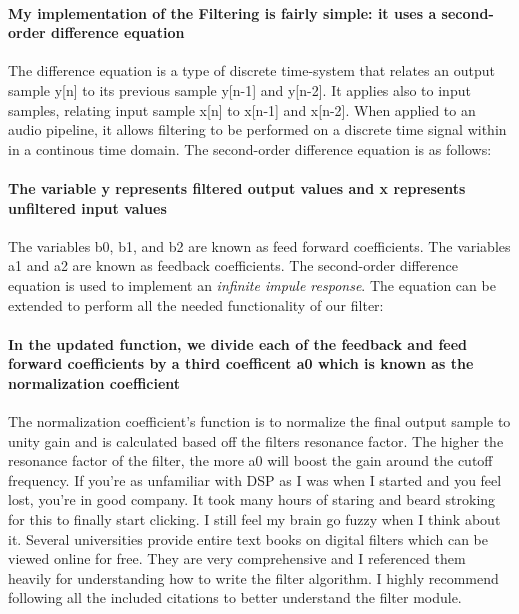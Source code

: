 \documentclass[acmlarge,screen]{acmart}
\begin{document}
	\paragraph{My implementation of the Filtering is fairly simple: it uses a second-order difference equation} The difference equation is a type of discrete time-system that relates an output sample y[n] to its previous sample y[n-1] and y[n-2]. It applies also to input samples, relating input sample x[n] to x[n-1] and x[n-2]. When applied to an audio pipeline, it allows filtering to be performed on a discrete time signal within in a continous time domain.\cite{stanford_2007} The second-order difference equation is as follows: 
	
	
	\paragraph{The variable y represents filtered output values and x represents unfiltered input values} The variables b0, b1, and b2 are known as feed forward coefficients. The variables a1 and a2 are known as feedback coefficients. The second-order difference equation is used to implement an \textit{infinite impule response}. The equation can be extended to perform all the needed functionality of our filter:
	
	
	\paragraph{In the updated function, we divide each of the feedback and feed forward coefficients by a third coefficent a0 which is known as the normalization coefficient} The normalization coefficient's function is to normalize the final output sample to unity gain and is calculated based off the filters resonance factor. The higher the resonance factor of the filter, the more a0 will boost the gain around the cutoff frequency. If you're as unfamiliar with DSP as I was when I started and you feel lost, you're in good company. It took many hours of staring and beard stroking for this to finally start clicking. I still feel my brain go fuzzy when I think about it. Several universities provide entire text books on digital filters which can be viewed online for free. They are very comprehensive and I referenced them heavily for understanding how to write the filter algorithm. I highly recommend following all the included citations to better understand the filter module. \cite{lacamera_2020}
	
\end{document}
